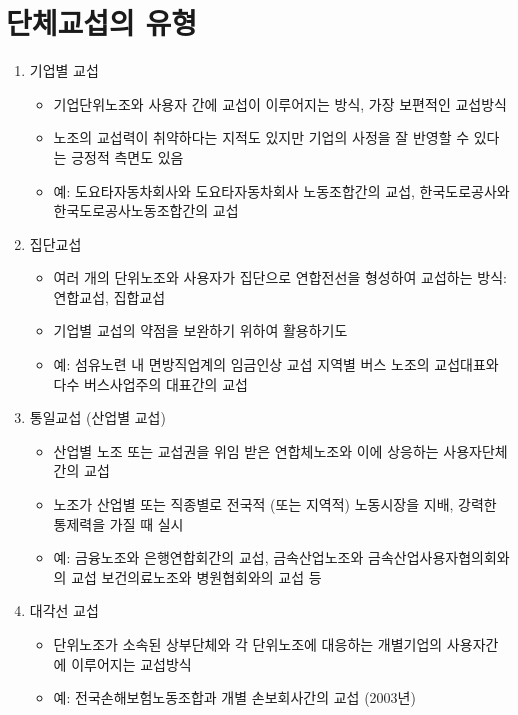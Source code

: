\documentclass[aspectratio=169,xcolor=dvipsnames,handout]{beamer}
\begin{document}
\section{단체교섭의 유형}
\begin{frame}[allowframebreaks]
    \begin{enumerate}[<+->]
        \item 기업별 교섭
        \begin{itemize}[<+->]
            \item 기업단위노조와 사용자 간에 교섭이 이루어지는 방식, 가장 보편적인 교섭방식
            \item 노조의 교섭력이 취약하다는 지적도 있지만 기업의 사정을 잘 반영할 수 있다는 긍정적 측면도 있음
            \item 예: 도요타자동차회사와 도요타자동차회사 노동조합간의 교섭, 한국도로공사와 한국도로공사노동조합간의 교섭
        \end{itemize}
    \item 집단교섭
        \begin{itemize}[<+->]
            \item 여러 개의 단위노조와 사용자가 집단으로 연합전선을 형성하여 교섭하는 방식: 연합교섭, 집합교섭
            \item 기업별 교섭의 약점을 보완하기 위하여 활용하기도
            \item 예: 섬유노련 내 면방직업계의 임금인상 교섭 지역별 버스 노조의 교섭대표와 다수 버스사업주의 대표간의 교섭
        \end{itemize}
    \item 통일교섭 (산업별 교섭)
        \begin{itemize}[<+->]
            \item 산업별 노조 또는 교섭권을 위임 받은 연합체노조와 이에 상응하는 사용자단체 간의 교섭
            \item 노조가 산업별 또는 직종별로 전국적 (또는 지역적) 노동시장을 지배, 강력한 통제력을 가질 때 실시
            \item 예: 금융노조와 은행연합회간의 교섭, 금속산업노조와 금속산업사용자협의회와의 교섭 보건의료노조와 병원협회와의 교섭 등
        \end{itemize}
    \item 대각선 교섭
        \begin{itemize}[<+->]
            \item 단위노조가 소속된 상부단체와 각 단위노조에 대응하는 개별기업의 사용자간에 이루어지는 교섭방식
            \item 예: 전국손해보험노동조합과 개별 손보회사간의 교섭 (2003년)

\end{itemize}
\end{enumerate}
\end{frame}
\end{document}
